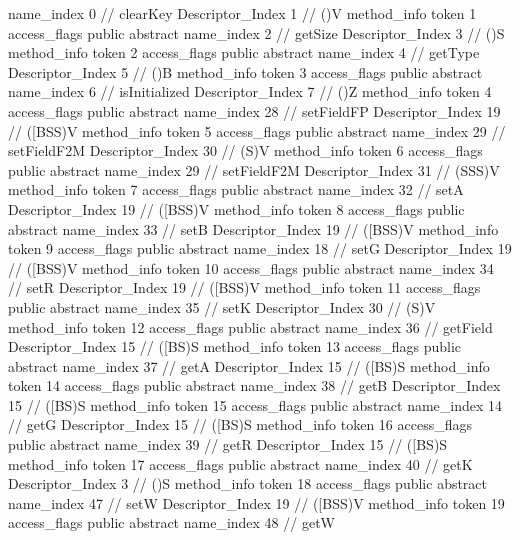{{{{{					name_index	0		// clearKey
					Descriptor_Index	1		// ()V
				}
				method_info {
					token	1
					access_flags	public abstract
					name_index	2		// getSize
					Descriptor_Index	3		// ()S
				}
				method_info {
					token	2
					access_flags	public abstract
					name_index	4		// getType
					Descriptor_Index	5		// ()B
				}
				method_info {
					token	3
					access_flags	public abstract
					name_index	6		// isInitialized
					Descriptor_Index	7		// ()Z
				}
				method_info {
					token	4
					access_flags	public abstract
					name_index	28		// setFieldFP
					Descriptor_Index	19		// ([BSS)V
				}
				method_info {
					token	5
					access_flags	public abstract
					name_index	29		// setFieldF2M
					Descriptor_Index	30		// (S)V
				}
				method_info {
					token	6
					access_flags	public abstract
					name_index	29		// setFieldF2M
					Descriptor_Index	31		// (SSS)V
				}
				method_info {
					token	7
					access_flags	public abstract
					name_index	32		// setA
					Descriptor_Index	19		// ([BSS)V
				}
				method_info {
					token	8
					access_flags	public abstract
					name_index	33		// setB
					Descriptor_Index	19		// ([BSS)V
				}
				method_info {
					token	9
					access_flags	public abstract
					name_index	18		// setG
					Descriptor_Index	19		// ([BSS)V
				}
				method_info {
					token	10
					access_flags	public abstract
					name_index	34		// setR
					Descriptor_Index	19		// ([BSS)V
				}
				method_info {
					token	11
					access_flags	public abstract
					name_index	35		// setK
					Descriptor_Index	30		// (S)V
				}
				method_info {
					token	12
					access_flags	public abstract
					name_index	36		// getField
					Descriptor_Index	15		// ([BS)S
				}
				method_info {
					token	13
					access_flags	public abstract
					name_index	37		// getA
					Descriptor_Index	15		// ([BS)S
				}
				method_info {
					token	14
					access_flags	public abstract
					name_index	38		// getB
					Descriptor_Index	15		// ([BS)S
				}
				method_info {
					token	15
					access_flags	public abstract
					name_index	14		// getG
					Descriptor_Index	15		// ([BS)S
				}
				method_info {
					token	16
					access_flags	public abstract
					name_index	39		// getR
					Descriptor_Index	15		// ([BS)S
				}
				method_info {
					token	17
					access_flags	public abstract
					name_index	40		// getK
					Descriptor_Index	3		// ()S
				}
				method_info {
					token	18
					access_flags	public abstract
					name_index	47		// setW
					Descriptor_Index	19		// ([BSS)V
				}
				method_info {
					token	19
					access_flags	public abstract
					name_index	48		// getW
}}}}}
